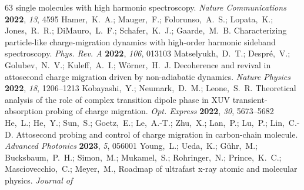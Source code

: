 \documentclass[journal=jacsat,manuscript=article]{achemso}
\begin{document}
\begin{mcitethebibliography}{63}
  single molecules with high harmonic spectroscopy. \emph{Nature
  Communications} \textbf{2022}, \emph{13}, 4595\relax
\mciteBstWouldAddEndPuncttrue
\mciteSetBstMidEndSepPunct{\mcitedefaultmidpunct}
{\mcitedefaultendpunct}{\mcitedefaultseppunct}\relax
\EndOfBibitem
{}
Hamer,~K.~A.; Mauger,~F.; Folorunso,~A.~S.; Lopata,~K.; Jones,~R.~R.;
  DiMauro,~L.~F.; Schafer,~K.~J.; Gaarde,~M.~B. Characterizing particle-like
  charge-migration dynamics with high-order harmonic sideband spectroscopy.
  \emph{Phys. Rev. A} \textbf{2022}, \emph{106}, 013103\relax
\mciteBstWouldAddEndPuncttrue
\mciteSetBstMidEndSepPunct{\mcitedefaultmidpunct}
{\mcitedefaultendpunct}{\mcitedefaultseppunct}\relax
\EndOfBibitem
{}
Matselyukh,~D.~T.; Despr{\'e},~V.; Golubev,~N.~V.; Kuleff,~A.~I.;
  W{\"o}rner,~H.~J. Decoherence and revival in attosecond charge migration
  driven by non-adiabatic dynamics. \emph{Nature Physics} \textbf{2022},
  \emph{18}, 1206--1213\relax
\mciteBstWouldAddEndPuncttrue
\mciteSetBstMidEndSepPunct{\mcitedefaultmidpunct}
{\mcitedefaultendpunct}{\mcitedefaultseppunct}\relax
\EndOfBibitem
{}
Kobayashi,~Y.; Neumark,~D.~M.; Leone,~S.~R. Theoretical analysis of the role of
  complex transition dipole phase in XUV transient-absorption probing of charge
  migration. \emph{Opt. Express} \textbf{2022}, \emph{30}, 5673--5682\relax
\mciteBstWouldAddEndPuncttrue
\mciteSetBstMidEndSepPunct{\mcitedefaultmidpunct}
{\mcitedefaultendpunct}{\mcitedefaultseppunct}\relax
\EndOfBibitem
{}
He,~L.; He,~Y.; Sun,~S.; Goetz,~E.; Le,~A.-T.; Zhu,~X.; Lan,~P.; Lu,~P.;
  Lin,~C.-D. {Attosecond probing and control of charge migration in
  carbon-chain molecule}. \emph{Advanced Photonics} \textbf{2023}, \emph{5},
  056001\relax
\mciteBstWouldAddEndPuncttrue
\mciteSetBstMidEndSepPunct{\mcitedefaultmidpunct}
{\mcitedefaultendpunct}{\mcitedefaultseppunct}\relax
\EndOfBibitem
{}
Young,~L.; Ueda,~K.; Gühr,~M.; Bucksbaum,~P.~H.; Simon,~M.; Mukamel,~S.;
  Rohringer,~N.; Prince,~K.~C.; Masciovecchio,~C.; Meyer,~M., 
  Roadmap of ultrafast x-ray atomic and molecular physics. \emph{Journal of
}
\end{mcitethebibliography}
\end{document}
